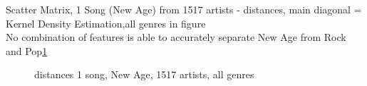 \noindent Scatter Matrix, 1 Song (New Age) from 1517 artists - distances, main diagonal = Kernel Density Estimation,all genres in figure\\
No combination of features is able to accurately separate New Age from Rock and Pop\ref{fig:corr6}
\begin{figure}[htbp]
	\centering
	\caption{distances 1 song, New Age, 1517 artists, all genres}
	\label{fig:corr6}
\end{figure}
\FloatBarrier

